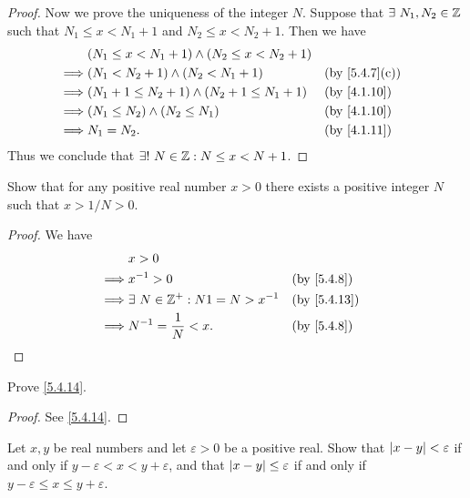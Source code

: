 \begin{proof}
  Now we prove the uniqueness of the integer \(N\).
  Suppose that \(\exists\ N_1, N_2 \in \mathbb{Z}\) such that \(N_1 \leq x < N_1 + 1\) and \(N_2 \leq x < N_2 + 1\).
  Then we have
  \begin{align*}
             & (N_1 \leq x < N_1 + 1) \land (N_2 \leq x < N_2 + 1)                                  \\
    \implies & (N_1 < N_2 + 1) \land (N_2 < N_1 + 1)               &  & \text{(by \cref{5.4.7}(c))} \\
    \implies & (N_1 + 1 \leq N_2 + 1) \land (N_2 + 1 \leq N_1 + 1) &  & \text{(by \cref{4.1.10})}   \\
    \implies & (N_1 \leq N_2) \land (N_2 \leq N_1)                 &  & \text{(by \cref{4.1.10})}   \\
    \implies & N_1 = N_2.                                          &  & \text{(by \cref{4.1.11})}
  \end{align*}
  Thus we conclude that \(\exists!\ N \in \mathbb{Z} : N \leq x < N + 1\).
\end{proof}

\begin{ex}\label{ex:5.4.4}
  Show that for any positive real number \(x > 0\) there exists a positive integer \(N\) such that \(x > 1 / N > 0\).
\end{ex}

\begin{proof}
  We have
  \begin{align*}
             & x > 0                                                                \\
    \implies & x^{-1} > 0                            &  & \by{5.4.8}                \\
    \implies & \exists\ N \in \Z^+ : N1 = N > x^{-1} &  & \text{(by \cref{5.4.13})} \\
    \implies & N^{-1} = \dfrac{1}{N} < x.            &  & \by{5.4.8}
  \end{align*}
\end{proof}

\begin{ex}\label{ex:5.4.5}
  Prove \cref{5.4.14}.
\end{ex}

\begin{proof}
  See \cref{5.4.14}.
\end{proof}

\begin{ex}\label{ex:5.4.6}
  Let \(x, y\) be real numbers and let \(\varepsilon > 0\) be a positive real.
  Show that \(\left\lvert x - y\right\rvert < \varepsilon\) if and only if \(y - \varepsilon < x < y + \varepsilon\), and that \(\left\lvert x - y\right\rvert \leq \varepsilon\) if and only if \(y - \varepsilon \leq x \leq y + \varepsilon\).
\end{ex}


